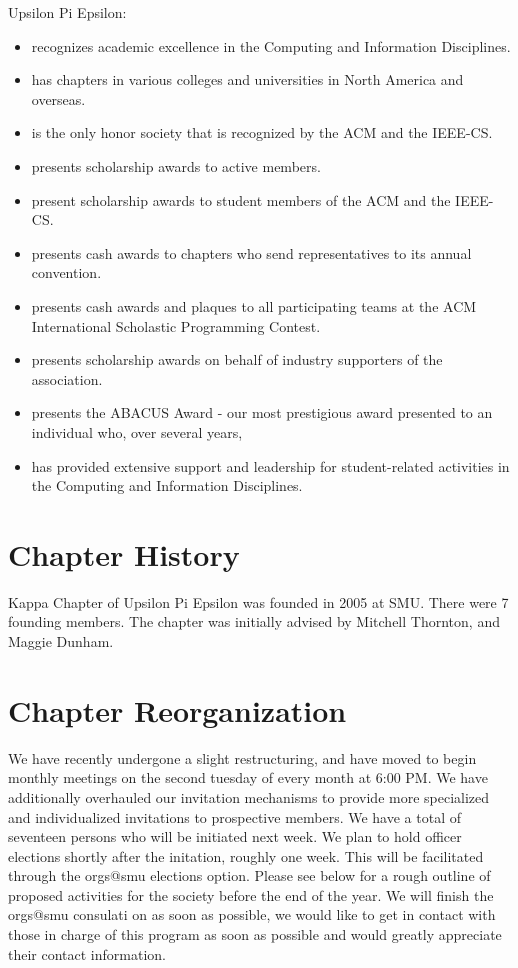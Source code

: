 \documentclass{article}
\begin{document}
    Upsilon Pi Epsilon:
    \begin{itemize}
    \item recognizes academic excellence in the Computing and Information Disciplines.
    \item has chapters in various colleges and universities in North America and overseas.
    \item is the only honor society that is recognized by the ACM and the IEEE-CS.
    \item presents scholarship awards to active members.
    \item present scholarship awards to student members of the ACM and the IEEE-CS.
    \item presents cash awards to chapters who send representatives to its annual convention.
    \item presents cash awards and plaques to all participating teams at the ACM International Scholastic Programming Contest.
    \item presents scholarship awards on behalf of industry supporters of the association.
    \item presents the ABACUS Award - our most prestigious award presented to an individual who, over several years, \item has provided extensive support and leadership for student-related activities in the Computing and Information Disciplines.
    \end{itemize}

\section{Chapter History}

    Kappa Chapter of Upsilon Pi Epsilon was founded in 2005 at SMU. There were 7 founding members. The chapter was initially advised by Mitchell Thornton, and Maggie Dunham.
 
\section{Chapter Reorganization}

    We have recently undergone a slight restructuring, and have moved to begin monthly meetings on the second tuesday of every month at 6:00 PM. We have additionally overhauled our invitation mechanisms to provide more specialized and individualized invitations to prospective members. We have a total of seventeen persons who will be initiated next week. We plan to hold officer elections shortly after the initation, roughly one week. This will be facilitated through the orgs@smu elections option. Please see below for a rough outline of proposed activities for the society before the end of the year. We will finish the orgs@smu consulati on as soon as possible, we would like to get in contact with those in charge of this program as soon as possible and would greatly appreciate their contact information. 
\end{document}
